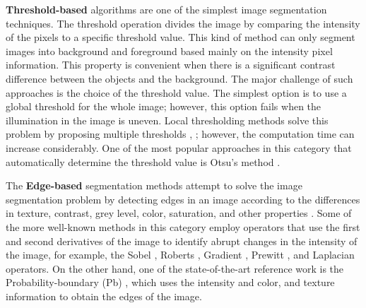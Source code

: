 \textbf{Threshold-based} algorithms are one of the simplest image segmentation techniques. The threshold operation divides the image by comparing the intensity of the pixels to a specific threshold value\citep{Sezgin.Sankur:EI:2010}. This kind of method can only segment images into background and foreground based mainly on the intensity pixel information. This property is convenient when there is a significant contrast difference between the objects and the background. The major challenge of such approaches is the choice of the threshold value. The simplest option is to use a global threshold for the whole image; however, this option fails when the illumination in the image is uneven. Local thresholding methods solve this problem by proposing multiple thresholds \citep{Niblack:ImageProcc:1986}, \citep{Sauvola.Pietikainen:ICPR:2000}; however, the computation time can increase considerably. One of the most popular approaches in this category that automatically determine the threshold value is Otsu's method \citep{Otsu:SMC:1979}.

The \textbf{Edge-based} segmentation methods attempt to solve the image segmentation problem by detecting edges in an image according to the differences in texture, contrast, grey level, color, saturation, and other properties \citep{Saini.Arora:IJICT:2014}. Some of the more well-known methods in this category employ operators that use the first and second derivatives of the image to identify abrupt changes in the intensity of the image, for example, the Sobel \citep{Sobel.Feldman:SAIL:1990}, Roberts \citep{Roberts:Thesis:1963}, Gradient \citep{Maitre:Book:2003}, Prewitt \citep{Prewitt:PPP:1970}, and Laplacian \citep{Marr.Hildreth:PRS:1980} operators. On the other hand, one of the state-of-the-art reference work is the Probability-boundary (Pb) \citep{Malik.Belongie.ea:IJCV:2001},  which uses the intensity and color, and texture information to obtain the edges of the image. 

